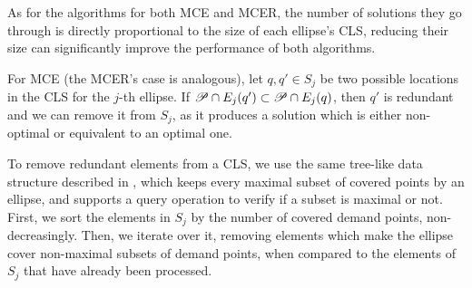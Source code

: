 As for the algorithms for both MCE and MCER, the number of solutions they go through is directly proportional to the size of each ellipse's CLS, reducing their size can significantly improve the performance of both algorithms. 

For MCE (the MCER's case is analogous), let $q, q' \in S_j$ be two possible locations in the CLS for the $j$-th ellipse. If $\mathscr{P} \cap E_j(q') \subset \mathscr{P} \cap E_j(q)$, then $q'$ is redundant and we can remove it from $S_j$, as it produces a solution which is either non-optimal or equivalent to an optimal one.

To remove redundant elements from a CLS, we use the same tree-like data structure described in \cite{andreta}, which keeps every maximal subset of covered points by an ellipse, and supports a query operation to verify if a subset is maximal or not.
First, we sort the elements in $S_j$ by the number of covered demand points, non-decreasingly. Then, we iterate over it, removing elements which make the ellipse cover non-maximal subsets of demand points, when compared to the elements of $S_j$ that have already been processed.
